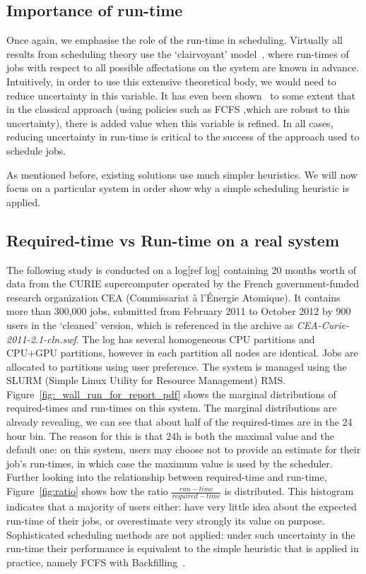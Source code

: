 \documentclass{article}
\begin{document}
\subsection{Importance of run-time}
\label{sub:importance_of_run-time}
Once again, we emphasise the role of the run-time in scheduling. Virtually all results from scheduling theory use the `clairvoyant' model~\cite{handbook-of-scheduling}, where run-times of jobs with respect to all possible affectations on the system are known in advance.
Intuitively, in order to use this extensive theoretical body, we would need to reduce uncertainty in this variable.
It has even been shown~\cite{tsafir} to some extent that in the classical approach (using policies such as FCFS ,which are robust to this uncertainty), there is added value when this variable is refined.
In all cases, reducing uncertainty in run-time is critical to the success of the approach used to schedule jobs.

As mentioned before, existing solutions use much simpler heuristics. We will now focus on a particular system in order show why a simple scheduling heuristic is applied.

\subsection{Required-time vs Run-time on a real system}
\label{sub:required-time_vs_run-time_on_a_real_system}
The following study is conducted on a log[ref log] containing 20 months worth of data from the CURIE supercomputer operated by the French government-funded research organization CEA (Commissariat à l'Énergie Atomique).
It contains more than 300,000 jobs, submitted from February 2011 to October 2012 by 900 users in the `cleaned' version, which is referenced in the archive as \textit{CEA-Curie-2011-2.1-cln.swf}.
The log has several homogeneous CPU partitions and CPU+GPU partitions, however in each partition all nodes are identical.
Jobs are allocated to partitions using user preference. The system is managed using the SLURM (Simple Linux Utility for Resource Management) RMS.
Figure~\ref{fig:_wall_run_for_report_pdf} shows the marginal distributions of required-times and run-times on this system. The marginal distributions are already revealing, we can see that about half of the required-times are in the 24 hour bin.
The reason for this is that 24h is both the maximal value and the default one: on this system, users may choose not to provide an estimate for their job's run-times, in which case the maximum value is used by the scheduler.
Further looking into the relationship between required-time and run-time, Figure~\ref{fig:ratio} shows how the ratio $\frac{run-time}{required-time}$ is distributed. This histogram indicates that a majority of users either: have very little idea about the expected run-time of their jobs, or overestimate very strongly its value on purpose. Sophisticated scheduling methods are not applied: under such uncertainty in the run-time their performance is equivalent to the simple heuristic that is applied in practice, namely FCFS with Backfilling~\cite{backfilling}.
\end{document}
